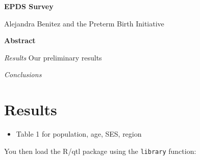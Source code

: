 \documentclass[12pt]{article}\usepackage[]{graphicx}\usepackage[]{color}
\begin{document}
{\textbf{EPDS Survey}}

Alejandra Benitez and the Preterm Birth Initiative




\bigskip
\textbf{Abstract}
\newline

\textit{Results}
Our preliminary results 

\textit{Conclusions}


\section{Results}
\begin{itemize}
\item Table 1 for population, age, SES, region
\end{itemize}
%
%
You then load the R/qtl package using the {\tt library} function:

\end{document}
